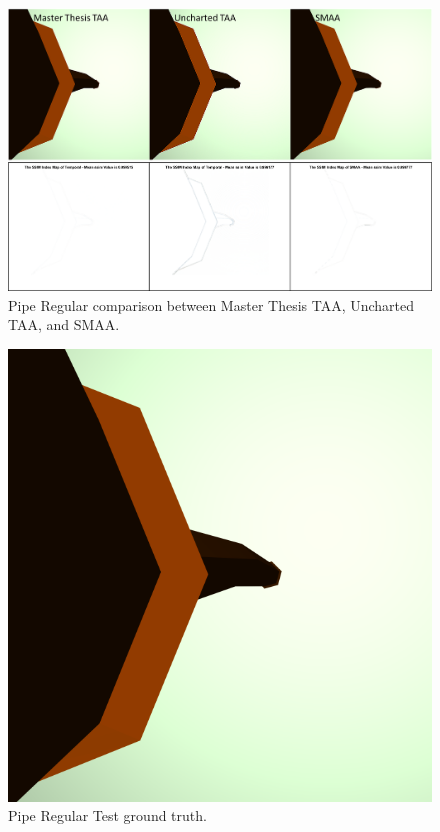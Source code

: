\documentclass{cslthse-msc}
\begin{document}
\begin{figure}[H]
	\centering
	\includegraphics[scale=0.5]{images/results/pipe_regular.png}
	\caption{Pipe Regular comparison between Master Thesis TAA, Uncharted TAA, and SMAA.}\label{fig:pipe_regular_render}
\end{figure}

\begin{figure}[H]
	\centering
	\includegraphics[scale=0.2]{images/results/pipe_regular_sobel_ground_truth.png}
	\caption{Pipe Regular Test ground truth.}\label{fig:pipe_regular_truth}
\end{figure}
\end{document}
